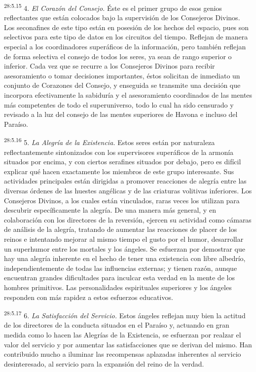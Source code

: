 \par
\textsuperscript{28:5.15} 4. \textit{El Corazón del Consejo.} Éste es el primer grupo de esos genios reflectantes que están colocados bajo la supervisión de los Consejeros Divinos. Los seconafines de este tipo están en posesión de los hechos del espacio, pues son selectivos para este tipo de datos en los circuitos del tiempo. Reflejan de manera especial a los coordinadores superáficos de la información, pero también reflejan de forma selectiva el consejo de todos los seres, ya sean de rango superior o inferior. Cada vez que se recurre a los Consejeros Divinos para recibir asesoramiento o tomar decisiones importantes, éstos solicitan de inmediato un conjunto de Corazones del Consejo, y enseguida se transmite una decisión que incorpora efectivamente la sabiduría y el asesoramiento coordinados de las mentes más competentes de todo el superuniverso, todo lo cual ha sido censurado y revisado a la luz del consejo de las mentes superiores de Havona e incluso del Paraíso.

\par
\textsuperscript{28:5.16} 5. \textit{La Alegría de la Existencia.} Estos seres están por naturaleza reflectantemente sintonizados con los supervisores superáficos de la armonía situados por encima, y con ciertos serafines situados por debajo, pero es difícil explicar qué hacen exactamente los miembros de este grupo interesante. Sus actividades principales están dirigidas a promover reacciones de alegría entre las diversas órdenes de las huestes angélicas y de las criaturas volitivas inferiores. Los Consejeros Divinos, a los cuales están vinculados, raras veces los utilizan para descubrir específicamente la alegría. De una manera más general, y en colaboración con los directores de la reversión, ejercen su actividad como cámaras de análisis de la alegría, tratando de aumentar las reacciones de placer de los reinos e intentando mejorar al mismo tiempo el gusto por el humor, desarrollar un superhumor entre los mortales y los ángeles. Se esfuerzan por demostrar que hay una alegría inherente en el hecho de tener una existencia con libre albedrío, independientemente de todas las influencias externas; y tienen razón, aunque encuentran grandes dificultades para inculcar esta verdad en la mente de los hombres primitivos. Las personalidades espirituales superiores y los ángeles responden con más rapidez a estos esfuerzos educativos.

\par
\textsuperscript{28:5.17} 6. \textit{La Satisfacción del Servicio.} Estos ángeles reflejan muy bien la actitud de los directores de la conducta situados en el Paraíso y, actuando en gran medida como lo hacen las Alegrías de la Existencia, se esfuerzan por realzar el valor del servicio y por aumentar las satisfacciones que se derivan del mismo. Han contribuido mucho a iluminar las recompensas aplazadas inherentes al servicio desinteresado, al servicio para la expansión del reino de la verdad.

